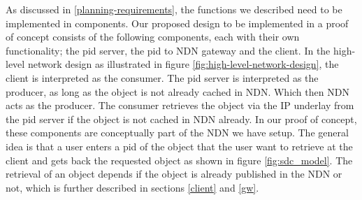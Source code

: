 
As discussed in \ref{planning-requirements}, the functions we described need to be implemented in components. Our proposed design to be implemented in a proof of concept consists of the following components, each with their own functionality; the \gls{pid} server, the \gls{pid} to NDN gateway and the client. In the high-level network design as illustrated in figure \ref{fig:high-level-network-design}, the client is interpreted as the consumer. The \gls{pid} server is interpreted as the producer, as long as the object is not already cached in NDN. Which then NDN acts as the producer. The consumer retrieves the object via the IP underlay from the \gls{pid} server if the object is not cached in NDN already. In our proof of concept, these components are conceptually part of the NDN we have setup. The general idea is that a user enters a \gls{pid} of the object that the user want to retrieve at the client and gets back the requested object as shown in figure \ref{fig:sdc_model}. The retrieval of an object depends if the object is already published in the NDN or not, which is further described in sections \ref{client} and \ref{gw}.



 

